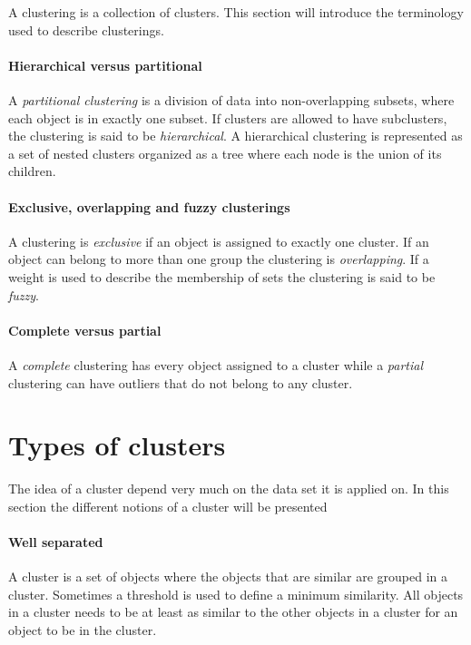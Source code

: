 A clustering is a collection of clusters.
This section will introduce the terminology used to describe clusterings. 

\paragraph{Hierarchical versus partitional}
A \textit{partitional clustering} is a division of data into non-overlapping subsets, where each object is in exactly one subset.
If clusters are allowed to have subclusters, the clustering is said to be \textit{hierarchical}.
A hierarchical clustering is represented as a set of nested clusters organized as a tree where each node is the union of its children.

\paragraph{Exclusive, overlapping and fuzzy clusterings}

A clustering is \textit{exclusive} if an object is assigned to exactly one cluster.
If an object can belong to more than one group the clustering is \textit{overlapping}.
If a weight is used to describe the membership of sets the clustering is said to be \textit{fuzzy}.

\paragraph{Complete versus partial}

A \textit{complete} clustering has every object assigned to a cluster while a \textit{partial} clustering can have outliers that do not belong to any cluster.

\section{Types of clusters}
The idea of a cluster depend very much on the data set it is applied on.
In this section the different notions of a cluster will be presented

\paragraph{Well separated}
A cluster is a set of objects where the objects that are similar are grouped in a cluster. 
Sometimes a threshold is used to define a minimum similarity. 
All objects in a cluster needs to be at least as similar to the other objects in a cluster for an object to be in the cluster.

